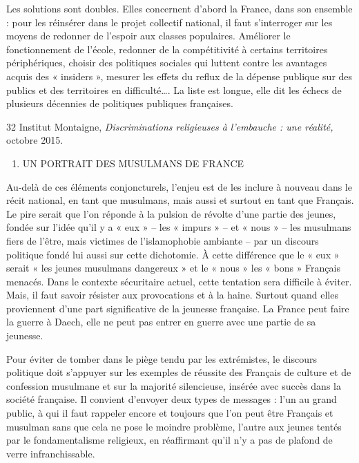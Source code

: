 Les solutions sont doubles. Elles concernent d'abord la France, dans son
ensemble : pour les réinsérer dans le projet collectif national, il faut
s'interroger sur les moyens de redonner de l'espoir aux classes
populaires. Améliorer le fonctionnement de l'école, redonner de la
compétitivité à certains territoires périphériques, choisir des
politiques sociales qui luttent contre les avantages acquis des «
insiders », mesurer les effets du reflux de la dépense publique sur des
publics et des territoires en difficulté\ldots. La liste est longue,
elle dit les échecs de plusieurs décennies de politiques publiques
françaises.

32 Institut Montaigne, \emph{Discriminations religieuses à l'embauche :
une réalité,} octobre 2015.


\begin{enumerate}
\def\labelenumi{\Roman{enumi}.}
\item
  UN PORTRAIT DES MUSULMANS DE FRANCE
\end{enumerate}


Au-delà de ces éléments conjoncturels, l'enjeu est de les inclure à
nouveau dans le récit national, en tant que musulmans, mais aussi et
surtout en tant que Français. Le pire serait que l'on réponde à la
pulsion de révolte d'une partie des jeunes, fondée sur l'idée qu'il y a
« eux » -- les « impurs » -- et « nous » -- les musulmans fiers de
l'être, mais victimes de l'islamophobie ambiante -- par un discours
politique fondé lui aussi sur cette dichotomie. À cette différence que
le « eux » serait « les jeunes musulmans dangereux » et le « nous » les
« bons » Français menacés. Dans le contexte sécuritaire actuel, cette
tentation sera difficile à éviter. Mais, il faut savoir résister aux
provocations et à la haine. Surtout quand elles proviennent d'une part
significative de la jeunesse française. La France peut faire la guerre à
Daech, elle ne peut pas entrer en guerre avec une partie de sa jeunesse.

Pour éviter de tomber dans le piège tendu par les extrémistes, le
discours politique doit s'appuyer sur les exemples de réussite des
Français de culture et de confession musulmane et sur la majorité
silencieuse, insérée avec succès dans la société française. Il convient
d'envoyer deux types de messages : l'un au grand public, à qui il faut
rappeler encore et toujours que l'on peut être Français et musulman sans
que cela ne pose le moindre problème, l'autre aux jeunes tentés par le
fondamentalisme religieux, en réaffirmant qu'il n'y a pas de plafond de
verre infranchissable.


